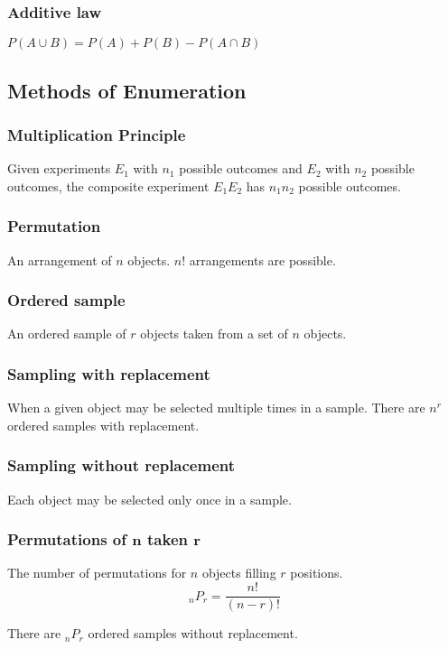 \documentclass{article}
\begin{document}
\begin{multicols*}{2}
\subsubsection{Additive law}
$P(A \cup B) = P(A) + P(B) - P(A \cap B)$

\subsection{Methods of Enumeration}

\subsubsection{Multiplication Principle}
Given experiments $E_1$ with $n_1$ possible outcomes and $E_2$ with $n_2$ possible outcomes, the composite experiment $E_1 E_2$ has $n_1 n_2$ possible outcomes.

\subsubsection{Permutation}
An arrangement of $n$ objects. $n!$ arrangements are possible.

\subsubsection{Ordered sample}
An ordered sample of $r$ objects taken from a set of $n$ objects.

\subsubsection{Sampling with replacement}
When a given object may be selected multiple times in a sample. There are $n^r$ ordered samples with replacement.

\subsubsection{Sampling without replacement}
Each object may be selected only once in a sample.

\subsubsection{Permutations of $\mathbf{n}$ taken $\mathbf{r}$}
The number of permutations for $n$ objects filling $r$ positions.
\[{}_n P_r = \frac{n!}{(n-r)!}\]

There are ${}_n P_r$ ordered samples without replacement.


\end{multicols*}
\end{document}
